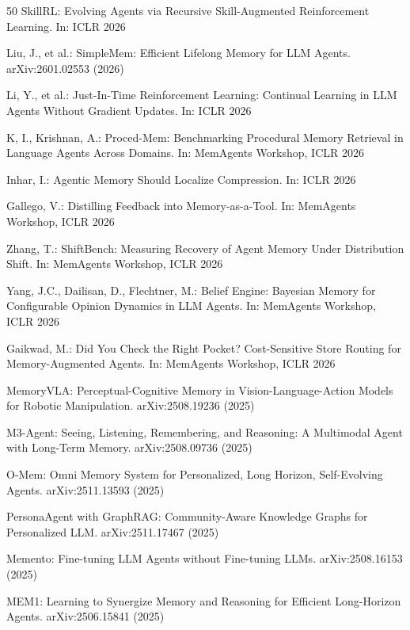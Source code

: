 \documentclass[hf]{ceurart}
\begin{document}
\begin{thebibliography}{50}
SkillRL: Evolving Agents via Recursive Skill-Augmented Reinforcement
Learning. In: ICLR 2026

Liu, J., et al.: SimpleMem: Efficient Lifelong Memory for LLM Agents.
arXiv:2601.02553 (2026)

Li, Y., et al.: Just-In-Time Reinforcement Learning: Continual
Learning in LLM Agents Without Gradient Updates. In: ICLR 2026

K, I., Krishnan, A.: Proced-Mem: Benchmarking Procedural Memory
Retrieval in Language Agents Across Domains. In: MemAgents Workshop,
ICLR 2026

Inhar, I.: Agentic Memory Should Localize Compression. In: ICLR 2026

Gallego, V.: Distilling Feedback into Memory-as-a-Tool. In: MemAgents
Workshop, ICLR 2026

Zhang, T.: ShiftBench: Measuring Recovery of Agent Memory Under
Distribution Shift. In: MemAgents Workshop, ICLR 2026

Yang, J.C., Dailisan, D., Flechtner, M.: Belief Engine: Bayesian
Memory for Configurable Opinion Dynamics in LLM Agents. In: MemAgents
Workshop, ICLR 2026

Gaikwad, M.: Did You Check the Right Pocket? Cost-Sensitive Store
Routing for Memory-Augmented Agents. In: MemAgents Workshop, ICLR 2026

MemoryVLA: Perceptual-Cognitive Memory in Vision-Language-Action
Models for Robotic Manipulation. arXiv:2508.19236 (2025)

M3-Agent: Seeing, Listening, Remembering, and Reasoning: A Multimodal
Agent with Long-Term Memory. arXiv:2508.09736 (2025)

O-Mem: Omni Memory System for Personalized, Long Horizon,
Self-Evolving Agents. arXiv:2511.13593 (2025)

PersonaAgent with GraphRAG: Community-Aware Knowledge Graphs for
Personalized LLM. arXiv:2511.17467 (2025)

Memento: Fine-tuning LLM Agents without Fine-tuning LLMs.
arXiv:2508.16153 (2025)

MEM1: Learning to Synergize Memory and Reasoning for Efficient
Long-Horizon Agents. arXiv:2506.15841 (2025)


\end{thebibliography}
\end{document}
